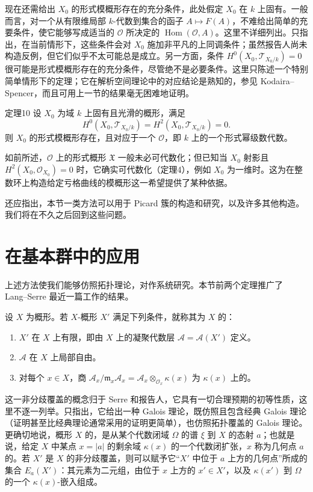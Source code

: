 现在还需给出 $X_0$ 的形式模概形存在的充分条件，此处假定 $X_0$ 在 $k$ 上固有。一般而言，对一个从有限维局部 $k$-代数到集合的函子 $A\mapsto F(A)$，不难给出简单的充要条件，使它能够写成适当的 $\mathcal O$ 所决定的 $\operatorname{Hom}(\mathcal O,A)$。这里不详细列出。只指出，在当前情形下，这些条件会对 $X_0$ 施加非平凡的上同调条件；虽然报告人尚未构造反例，但它们似乎不太可能总是成立。另一方面，条件 $H^0(X_0,\mathcal T_{X_0/k})=0$ 很可能是形式模概形存在的充分条件，尽管绝不是必要条件。这里只陈述一个特别简单情形下的定理；它在解析空间理论中的对应结论是熟知的，参见 Kodaira--Spencer，而且可用上一节的结果毫无困难地证明。
\begin{statement}{定理10}
设 $X_0$ 为域 $k$ 上固有且光滑的概形，满足
\[
H^0(X_0,\mathcal T_{X_0/k})=H^2(X_0,\mathcal T_{X_0/k})=0.
\]
则 $X_0$ 的形式模概形存在，且对应于一个 $\mathcal O$，即 $k$ 上的一个形式幂级数代数。
\end{statement}
如前所述，$\mathcal O$ 上的形式概形 $\mathfrak X$ 一般未必可代数化；但已知当 $X_0$ 射影且 $H^2(X_0,\mathcal O_{X_0})=0$ 时，它确实可代数化（定理4），例如 $X_0$ 为一维时。这为在整数环上构造给定亏格曲线的模概形这一希望提供了某种依据。

还应指出，本节一类方法可以用于 Picard 簇的构造和研究，以及许多其他构造。我们将在不久之后回到这些问题。

\section{在基本群中的应用}
上述方法使我们能够仿照拓扑理论，对作系统研究。本节前两个定理推广了 Lang--Serre 最近一篇工作的结果。

设 $X$ 为概形。若 $X$-概形 $X'$ 满足下列条件，就称其为 $X$ 的：
\begin{enumerate}
\item[(i)] $X'$ 在 $X$ 上有限，即由 $X$ 上的凝聚代数层 $\mathcal A=\mathcal A(X')$ 定义。
\item[(ii)] $\mathcal A$ 在 $X$ 上局部自由。
\item[(iii)] 对每个 $x\in X$，商 $\mathcal A_x/\mathfrak m_x\mathcal A_x=\mathcal A_x\otimes_{\mathcal O_x}\kappa(x)$ 为 $\kappa(x)$ 上的。
\end{enumerate}
这一非分歧覆盖的概念归于 Serre 和报告人，它具有一切合理预期的初等性质，这里不逐一列举。只指出，它给出一种 Galois 理论，既仿照且包含经典 Galois 理论（证明甚至比经典理论通常采用的证明更简单），也仿照拓扑覆盖的 Galois 理论。更确切地说，概形 $X$ 的，是从某个代数闭域 $\Omega$ 的谱 $\xi$ 到 $X$ 的态射 $a$；也就是说，给定 $X$ 中某点 $x=|a|$ 的剩余域 $\kappa(x)$ 的一个代数闭扩张，$x$ 称为几何点 $a$ 的。若 $X'$ 是 $X$ 的非分歧覆盖，则可以赋予它“$X'$ 中位于 $a$ 上方的几何点”所成的集合 $E_a(X')$：其元素为二元组，由位于 $x$ 上方的 $x'\in X'$，以及 $\kappa(x')$ 到 $\Omega$ 的一个 $\kappa(x)$-嵌入组成。

